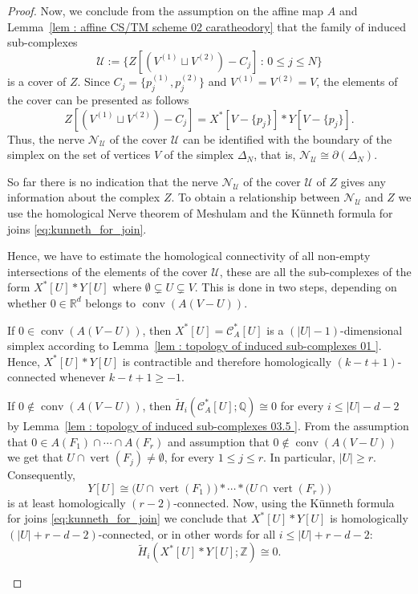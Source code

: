 \documentclass[a4paper,11pt,reqno, english]{amsart}
\theoremstyle{definition}
\theoremstyle{remark}
\newcommand\R{\mathbb R}
\newcommand\Z{\mathbb Z}
\newcommand\Q{\mathbb Q}
\newcommand\NN{\mathscr N}
\newcommand\U{\mathscr U}
\newcommand\CC{\mathscr C}
\DeclareMathOperator{\vertex}{\mathrm{vert}}
\DeclareMathOperator{\conv}{\mathrm{conv}}
\begin{document}
\begin{proof}
	\medskip
	Now, we conclude from the assumption on the affine map $A$ and Lemma~\ref{lem : affine CS/TM scheme 02 caratheodory} that the family of induced sub-complexes
	\[
		\U :=  \{ Z[(V^{(1)}\sqcup  V^{(2)}) - C_{j} ] \,:\,  0\leq j\leq N\}
	\]
	is a cover of $Z$.
	Since $C_{j}=\{p_{j}^{(1)},p_{j}^{(2)}\}$ and $V^{(1)}=V^{(2)}=V$, the elements of the cover can be presented as follows
	\[
		Z[(V^{(1)}\sqcup  V^{(2)}) - C_{j} ]= X^*[V-\{p_{j}\}]*Y[V-\{p_{j}\}].
	\]
	Thus, the nerve $\NN_{\U}$ of the cover $\U$ can be identified with the boundary of the simplex on the set of vertices $V$ of the simplex $\Delta_N$, that is, $\NN_{\U}\cong \partial (\Delta_{N})$.


	\medskip
	So far there is no indication that the nerve $\NN_{\U}$ of the cover $\U$ of $Z$ gives any information about the complex $Z$.
	To obtain a relationship between $\NN_{\U}$ and $Z$ we use the homological Nerve theorem of Meshulam \cite[Thm.\,2.1]{Meshulam2001} and the K\"unneth formula for joins \eqref{eq:kunneth_for_join}.

	\medskip
	Hence, we have to estimate the homological connectivity of all non-empty intersections of the elements of the cover $\U$, these are all the sub-complexes of the form $X^*[U]*Y[U]$ where $\emptyset \subsetneq  U \subsetneq  V$.
	This is done in two steps, depending on whether $0\in\R^d$ belongs to $\conv(A(V-U))$.
	\begin{compactenum}[\quad\rm (1)]
		\item If $0\in\conv(A(V-U))$, then $X^*[U]=\CC_A^*[U]$ is a $(|U|-1)$-dimensional simplex according to Lemma~\ref{lem : topology of induced sub-complexes 01 }. Hence, $X^*[U]*Y[U]$ is contractible and therefore homologically $(k-t+1)$-connected whenever $k-t+1\geq -1$.
		\item If $0\notin\conv(A(V-U))$, then $\widetilde{H}_i(\CC_A^*[U];\Q)\cong 0$ for every  $i\leq |U|-d-2$  by Lemma~\ref{lem : topology of induced sub-complexes 03.5 }. From the assumption that $0\in A(F_1)\cap\cdots\cap A(F_r)$ and assumption that $0\notin\conv(A(V-U))$ we get that
		$U \cap  \vertex(F_j)  \neq\emptyset$,
		for every $1\leq j\leq r$. In particular, $|U|\geq r$. Consequently,
		\[ Y[U]\cong \big( U\cap \vertex({F_1})\big) *\cdots *\big( U\cap \vertex ({F_r})\big) \]
		is at least homologically $(r-2)$-connected. Now, using the K\"unneth formula for joins \eqref{eq:kunneth_for_join} we conclude that $X^*[U]*Y[U]$ is homologically $(|U|+r-d-2)$-connected, or in other words for all $i\leq |U|+r-d-2$:
		\[
			\widetilde{H}_i(X^*[U]*Y[U];\Z)\cong 0.
		\]


\end{compactenum}
\end{proof}
\end{document}

